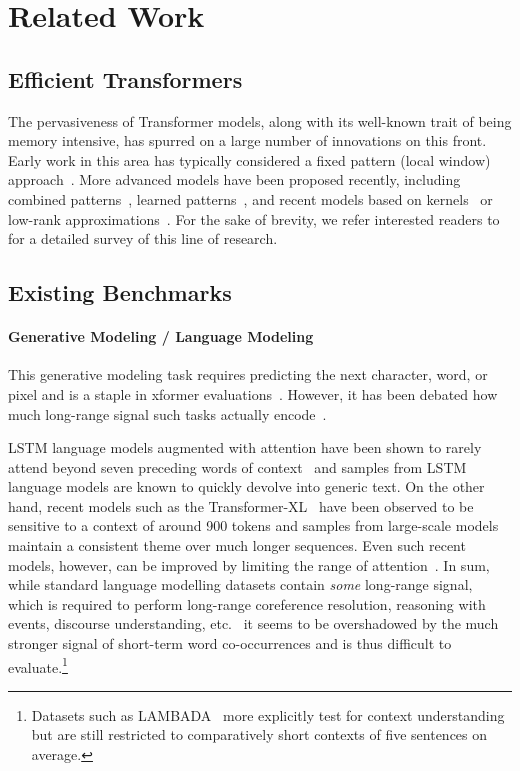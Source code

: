 \documentclass{article} \usepackage{iclr2021_conference,times}
\begin{document}
\section{Related Work}

\subsection{Efficient Transformers}
The pervasiveness of Transformer models, along with its well-known trait of being memory intensive, has spurred on a large number of innovations on this front. Early work in this area has typically considered a fixed pattern (local window) approach~\citep{liu2018generating,parmar2018image}. More advanced models have been proposed recently, including combined patterns~\citep{child2019generating,ho2019axial,beltagy2020longformer,zaheer2020big}, learned patterns~\citep{kitaev2020reformer,roy2020efficient}, and recent models based on kernels~\citep{katharopoulos2020transformers,choromanski2020masked} or low-rank approximations~\citep{wang2020linformer}. For the sake of brevity, we refer interested readers to~\citep{tay2020efficient} for a detailed survey of this line of research.

\subsection{Existing Benchmarks} 

\paragraph{Generative Modeling / Language Modeling} This generative modeling task requires predicting the next character, word, or pixel and is a staple in xformer evaluations~\citep{roy2020efficient,kitaev2020reformer}. However, it has been debated how much long-range signal such tasks actually encode~\citep{Rae2020}.

LSTM language models augmented with attention have been shown to rarely attend beyond seven preceding words of context~\citep{Daniluk2017} and samples from LSTM language models are known to quickly devolve into generic text. On the other hand, recent models such as the Transformer-XL~\citep{Dai2019transformerxl} have been observed to be sensitive to a context of around 900 tokens and samples from large-scale models~\citep{Radford2019} maintain a consistent theme over much longer sequences. Even such recent models, however, can be improved by limiting the range of attention~\citep{Rae2020}. In sum, while standard language modelling datasets contain \emph{some} long-range signal, which is required to perform long-range coreference resolution, reasoning with events, discourse understanding, etc.~\citep{ruder2019transfer} it seems to be overshadowed by the much stronger signal of short-term word co-occurrences and is thus difficult to evaluate.\footnote{Datasets such as LAMBADA~\citep{Paperno2016lambada} more explicitly test for context understanding but are still restricted to comparatively short contexts of five sentences on average.} 
\end{document}
